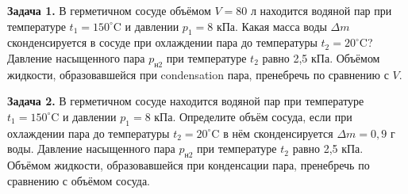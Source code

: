 
\begin{taskbasic}[code={\label{task:mkt_hum_v15_n24}}]
\textbf{Задача 1.} В герметичном сосуде объёмом $V = 80$ л находится водяной пар при температуре $t_1 = 150^{\circ}\text{C}$ и давлении $p_1 = 8$ кПа. Какая масса воды $\Delta m$ сконденсируется в сосуде при охлаждении пара до температуры $t_2 = 20^{\circ}\text{C}$? Давление насыщенного пара $p_{\text{н}2}$ при температуре $t_2$ равно 2,5 кПа. Объёмом жидкости, образовавшейся при condensation пара, пренебречь по сравнению с $V$.

\end{taskbasic}

\begin{taskbasic}[code={\label{task:mkt_hum_v16_n24}}]
\textbf{Задача 2.} В герметичном сосуде находится водяной пар при температуре $t_1 = 150^{\circ}\text{C}$ и давлении $p_1 = 8$ кПа. Определите объём сосуда, если при охлаждении пара до температуры $t_2 = 20^{\circ}\text{C}$ в нём сконденсируется $\Delta m = 0,9$ г воды. Давление насыщенного пара $p_{\text{н}2}$ при температуре $t_2$ равно 2,5 кПа. Объёмом жидкости, образовавшейся при конденсации пара, пренебречь по сравнению с объёмом сосуда.

\end{taskbasic}


